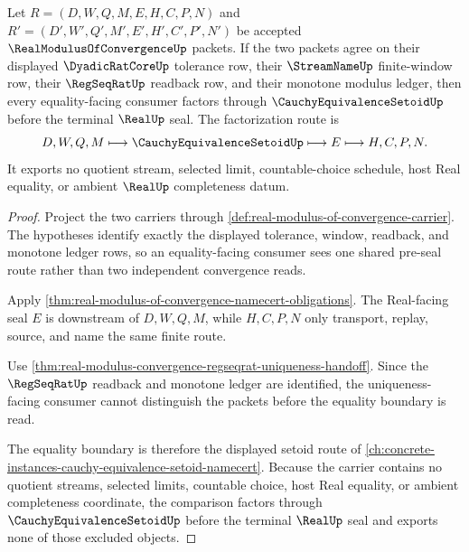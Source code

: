 \begin{theorem}
\label{thm:real-modulus-of-convergence-cauchy-equivalence-setoid-factorization}
Let $R=(D,W,Q,M,E,H,C,P,N)$ and $R'=(D',W',Q',M',E',H',C',P',N')$ be accepted $\RealModulusOfConvergenceUp$ packets. If the two packets agree on their displayed $\DyadicRatCoreUp$ tolerance row, their $\StreamNameUp$ finite-window row, their $\RegSeqRatUp$ readback row, and their monotone modulus ledger, then every equality-facing consumer factors through $\CauchyEquivalenceSetoidUp$ before the terminal $\RealUp$ seal. The factorization route is
$$
D,W,Q,M \longmapsto \CauchyEquivalenceSetoidUp \longmapsto E \longmapsto H,C,P,N .
$$
It exports no quotient stream, selected limit, countable-choice schedule, host Real equality, or ambient $\RealUp$ completeness datum.
\end{theorem}
\begin{proof}
Project the two carriers through \autoref{def:real-modulus-of-convergence-carrier}. The hypotheses identify exactly the displayed tolerance, window, readback, and monotone ledger rows, so an equality-facing consumer sees one shared pre-seal route rather than two independent convergence reads.

Apply \autoref{thm:real-modulus-of-convergence-namecert-obligations}. The Real-facing seal $E$ is downstream of $D,W,Q,M$, while $H,C,P,N$ only transport, replay, source, and name the same finite route.

Use \autoref{thm:real-modulus-convergence-regseqrat-uniqueness-handoff}. Since the $\RegSeqRatUp$ readback and monotone ledger are identified, the uniqueness-facing consumer cannot distinguish the packets before the equality boundary is read.

The equality boundary is therefore the displayed setoid route of \autoref{ch:concrete-instances-cauchy-equivalence-setoid-namecert}. Because the carrier contains no quotient streams, selected limits, countable choice, host Real equality, or ambient completeness coordinate, the comparison factors through $\CauchyEquivalenceSetoidUp$ before the terminal $\RealUp$ seal and exports none of those excluded objects.
\end{proof}

